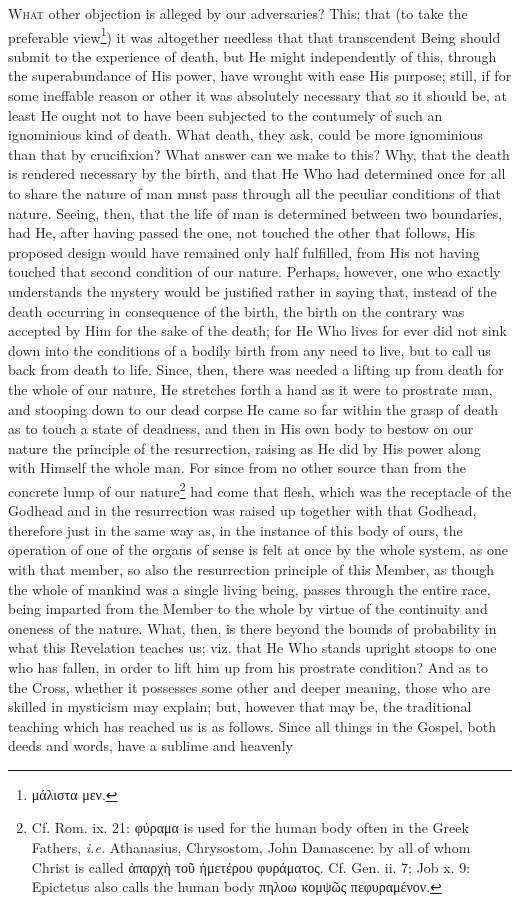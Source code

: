 \textsc{What} other objection is alleged by our adversaries? This; that (to take the preferable view\footnote{\textgreek{μάλιστα μεν}.}) it was altogether needless that that transcendent Being should submit to the experience of death, but He might independently of this, through the superabundance of His power, have wrought with ease His purpose; still, if for some ineffable reason or other it was absolutely necessary that so it should be, at least He ought not to have been subjected to the contumely of such an ignominious kind of death. What death, they ask, could be more ignominious than that by crucifixion? What answer can we make to this? Why, that the death is rendered necessary by the birth, and that He Who had determined once for all to share the nature of man must pass through all the peculiar conditions of that nature. Seeing, then, that the life of man is determined between two boundaries, had He, after having passed the one, not touched the other that follows, His proposed design would have remained only half fulfilled, from His not having touched that second condition of our nature. Perhaps, however, one who exactly understands the mystery would be justified rather in saying that, instead of the death occurring in consequence of the birth, the birth on the contrary was accepted by Him for the sake of the death; for He Who lives for ever did not sink down into the conditions of a bodily birth from any need to live, but to call us back from death to life. Since, then, there was needed a lifting up from death for the whole of our nature, He stretches forth a hand as it were to prostrate man, and stooping down to our dead corpse He came so far within the grasp of death as to touch a state of deadness, and then in His own body to bestow on our nature the principle of the resurrection, raising as He did by His power along with Himself the whole man. For since from no other source than from the concrete lump of our nature\footnote{Cf. Rom. ix. 21: \textgreek{φύραμα} is used for the human body often in the Greek Fathers, \emph{i.e.} Athanasius, Chrysostom, John Damascene: by all of whom Christ is called \textgreek{ἀπαρχὴ τοῦ ἡμετέρου φυράματος}. Cf. Gen. ii. 7; Job x. 9: Epictetus also calls the human body \textgreek{πηλοω κομψῶς πεφυραμένον.}} had come that flesh, which was the receptacle of the Godhead and in the resurrection was raised up together with that Godhead, therefore just in the same way as, in the instance of this body of ours, the operation of one of the organs of sense is felt at once by the whole system, as one with that member, so also the resurrection principle of this Member, as though the whole of mankind was a single living being, passes through the entire race, being imparted from the Member to the whole by virtue of the continuity and oneness of the nature. What, then, is there beyond the bounds of probability in what this Revelation teaches us; viz. that He Who stands upright stoops to one who has fallen, in order to lift him up from his prostrate condition? And as to the Cross, whether it possesses some other and deeper meaning, those who are skilled in mysticism may explain; but, however that may be, the traditional teaching which has reached us is as follows. Since all things in the Gospel, both deeds and words, have a sublime and heavenly 